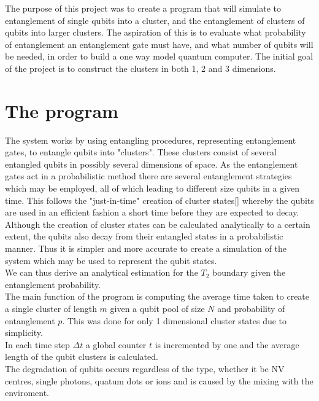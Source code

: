 \documentclass{article}
\numberwithin{equation}{section} %
\begin{document}
The purpose of this project was to create a program that will simulate to entanglement of single qubits into a cluster, and the entanglement of clusters of qubits into larger clusters. The aspiration of this is to evaluate what probability of entanglement an entanglement gate must have, and what number of qubits will be needed, in order to build a one way model quantum computer. The initial goal of the project is to construct the clusters in both 1, 2 and 3 dimensions. 

\section{The program}
 The system works by using entangling procedures, representing entanglement gates, to entangle qubits into "clusters". These clusters consist of several entangled qubits in possibly several dimensions of space. As the entanglement gates act in a probabilistic method there are several entanglement strategies which may be employed, all of which leading to different size qubits in a given time. This follows the "just-in-time" creation of cluster states[] whereby the qubits are used in an efficient fashion a short time before they are expected to decay.  \\

Although the creation of cluster states can be calculated analytically to a certain extent, the qubits also decay from their entangled states in a probabilistic manner. Thus it is simpler and more accurate to create a simulation of the system which may be used to represent the qubit states.  \\ 

We can thus derive an analytical estimation for the $T_2$ boundary given the entanglement probability. \\

The main function of the program is computing the average time taken to create a single cluster of length $m$ given a qubit pool of size $N$ and probability of entanglement $p$. This was done for only 1 dimensional cluster states due to simplicity.  \\

 In each time step $\Delta t$ a global counter $t$ is incremented by one and the average length of the qubit clusters is calculated. \\
 
The degradation of qubits occurs regardless of the type, whether it be NV centres, single photons, quatum dots or ions and is caused by the mixing with the enviroment. \\
\end{document}
